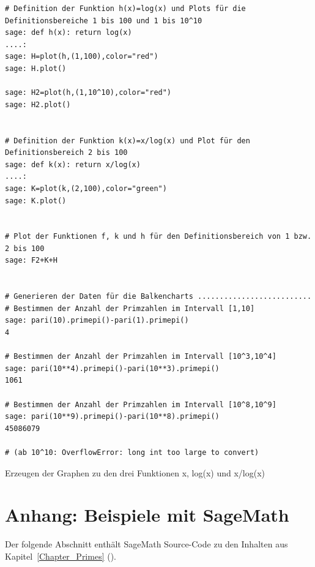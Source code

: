 \begin{refsegment}
\begin{sagecode}
\begin{Verbatim}
# Definition der Funktion h(x)=log(x) und Plots für die Definitionsbereiche 1 bis 100 und 1 bis 10^10
sage: def h(x): return log(x)
....:
sage: H=plot(h,(1,100),color="red")
sage: H.plot()

sage: H2=plot(h,(1,10^10),color="red")
sage: H2.plot()


# Definition der Funktion k(x)=x/log(x) und Plot für den Definitionsbereich 2 bis 100
sage: def k(x): return x/log(x)
....:
sage: K=plot(k,(2,100),color="green")
sage: K.plot()


# Plot der Funktionen f, k und h für den Definitionsbereich von 1 bzw. 2 bis 100
sage: F2+K+H


# Generieren der Daten für die Balkencharts ..........................
# Bestimmen der Anzahl der Primzahlen im Intervall [1,10]
sage: pari(10).primepi()-pari(1).primepi()
4

# Bestimmen der Anzahl der Primzahlen im Intervall [10^3,10^4]
sage: pari(10**4).primepi()-pari(10**3).primepi()
1061

# Bestimmen der Anzahl der Primzahlen im Intervall [10^8,10^9]
sage: pari(10**9).primepi()-pari(10**8).primepi()
45086079

# (ab 10^10: OverflowError: long int too large to convert)

\end{Verbatim}
\caption{Erzeugen der Graphen zu den drei Funktionen x, log(x) und x/log(x)}
\end{sagecode}




\clearpage
\newpage
\hypertarget{primes:_Appendix_Sage-Samples}{}
\section{Anhang: Beispiele mit SageMath}
\label{primes:_Appendix_Sage-Samples}

\noindent Der folgende Abschnitt enthält SageMath Source-Code zu den Inhalten aus
Kapitel~\ref{Chapter_Primes} (\glqq {}\grqq).



\end{refsegment}
